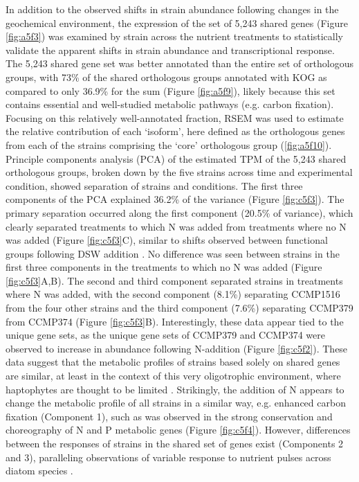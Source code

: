 In addition to the observed shifts in strain abundance following changes in the geochemical environment, the expression of the set of 5,243 shared genes (Figure \ref{fig:a5f3}) was examined by strain across the nutrient treatments to statistically validate the apparent shifts in strain abundance and transcriptional response. The 5,243 shared gene set was better annotated than the entire set of orthologous groups, with 73\% of the shared orthologous groups annotated with KOG as compared to only 36.9\% for the sum (Figure \ref{fig:a5f9}), likely because this set contains essential and well-studied metabolic pathways (e.g. carbon fixation). Focusing on this relatively well-annotated fraction, RSEM \citep{Li2011} was used to estimate the relative contribution of each `isoform', here defined as the orthologous genes from each of the strains comprising the `core' orthologous group (\ref{fig:a5f10}). Principle components analysis (PCA) of the estimated TPM of the 5,243 shared orthologous groups, broken down by the five strains across time and experimental condition, showed separation of strains and conditions. The first three components of the PCA explained 36.2\% of the variance (Figure \ref{fig:c5f3}). The primary separation occurred along the first component (20.5\% of variance), which clearly separated treatments to which N was added from treatments where no N was added (Figure \ref{fig:c5f3}C), similar to shifts observed between functional groups following DSW addition \citep{Alexander2015a}. No difference was seen between strains in the first three components in the treatments to which no N was added (Figure \ref{fig:c5f3}A,B). The second and third component separated strains in treatments where N was added, with the second component (8.1\%) separating CCMP1516 from the four other strains and the third component (7.6\%) separating CCMP379 from CCMP374 (Figure \ref{fig:c5f3}B). Interestingly, these data appear tied to the unique gene sets, as the unique gene sets of CCMP379 and CCMP374 were observed to increase in abundance following N-addition (Figure \ref{fig:c5f2}). These data suggest that the metabolic profiles of strains based solely on shared genes are similar, at least in the context of this very oligotrophic environment, where haptophytes are thought to be limited \citep{Alexander2015a}. Strikingly, the addition of N appears to change the metabolic profile of all strains in a similar way, e.g. enhanced carbon fixation (Component 1), such as was observed in the strong conservation and choreography of N and P metabolic genes (Figure \ref{fig:c5f4}). However, differences between the responses of strains in the shared set of genes exist (Components 2 and 3), paralleling observations of variable response to nutrient pulses across diatom species \citep{Alexander2015}.  \par

